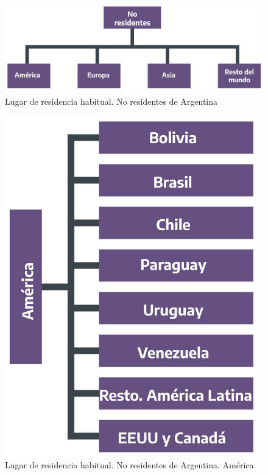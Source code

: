 \documentclass[
]{book}
\begin{document}
\hfill\break

\begin{figure}

{\centering \includegraphics[width=0.8\linewidth]{imagenes/figura_2_2} 

}

\caption{Lugar de residencia habitual. No residentes de Argentina}\label{fig:no-residentes}
\end{figure}

\begin{figure}

{\centering \includegraphics[width=0.8\linewidth]{imagenes/figura_2_2_1} 

}

\caption{Lugar de residencia habitual. No residentes de Argentina. América}\label{fig:america-latina}
\end{figure}
\end{document}
